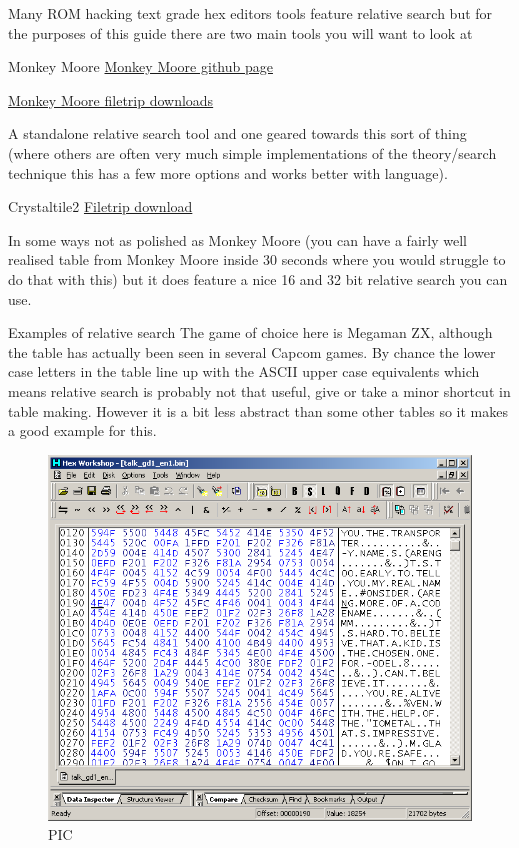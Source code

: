 \documentclass[
]{book}
\begin{document}
Many ROM hacking text grade hex editors tools feature relative search but for the purposes of this guide there are two main tools you will want to look at

Monkey Moore \href{https://github.com/rjricken/monkey-moore}{Monkey Moore github page}

\href{http://filetrip.net/pc-downloads/applications/download-monkey-moore-05-f29133.html}{Monkey Moore filetrip downloads}

A standalone relative search tool and one geared towards this sort of thing (where others are often very much simple implementations of the theory/search technique this has a few more options and works better with language).

Crystaltile2 \href{http://filetrip.net/f23649-CrystalTile2-2010-09-06.html}{Filetrip download}

In some ways not as polished as Monkey Moore (you can have a fairly well realised table from Monkey Moore inside 30 seconds where you would struggle to do that with this) but it does feature a nice 16 and 32 bit relative search you can use.

Examples of relative search The game of choice here is Megaman ZX, although the table has actually been seen in several Capcom games. By chance the lower case letters in the table line up with the ASCII upper case equivalents which means relative search is probably not that useful, give or take a minor shortcut in table making. However it is a bit less abstract than some other tables so it makes a good example for this.

\begin{figure}
\centering
\includegraphics{images/80_home_fast6191_romhackingguide_unrenamed_file___inal_borders_romhackingguiderelativesearch1.png}
\caption{PIC}
\end{figure}
\end{document}
